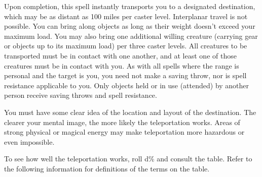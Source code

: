 Upon completion, this spell instantly transports you to a designated destination, which may be as distant as 100 miles per caster level. 
Interplanar travel is not possible. You can bring along objects as long as their weight doesn't exceed your maximum load.
You may also bring one additional willing creature (carrying gear or objects up to its maximum load) per three caster levels. 
All creatures to be transported must be in contact with one another, and at least one of those creatures must be in contact with you. 
As with all spells where the range is personal and the target is you, you need not make a saving throw, nor is spell resistance applicable to you. 
Only objects held or in use (attended) by another person receive saving throws and spell resistance.

You must have some clear idea of the location and layout of the destination. 
The clearer your mental image, the more likely the teleportation works. 
Areas of strong physical or magical energy may make teleportation more hazardous or even impossible.

To see how well the teleportation works, roll d\% and consult the  table. 
Refer to the following information for definitions of the terms on the table.

\begin{table}
\label{tab:Teleport}
\caption{Teleport destinations}
\begin{center}
\end{center}
\end{table}

